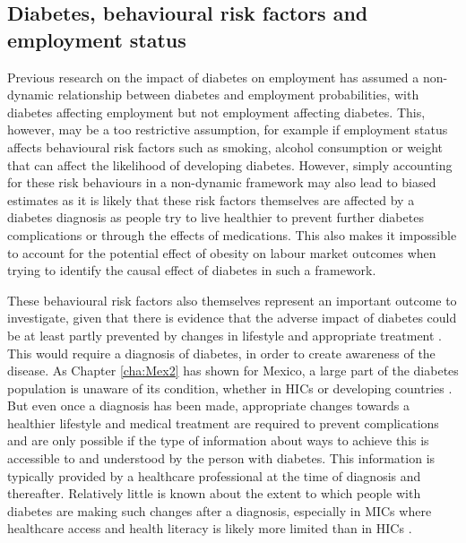 \subsection{Diabetes, behavioural risk factors and employment status}

Previous research on the impact of diabetes on employment has assumed a non-dynamic relationship between diabetes and employment probabilities, with diabetes affecting employment but not employment affecting diabetes. This, however, may be a too restrictive assumption, for example if employment status affects behavioural risk factors such as smoking, alcohol consumption or weight that can affect the likelihood of developing diabetes. However, simply accounting for these risk behaviours in a non-dynamic framework may also lead to biased estimates as it is likely that these risk factors themselves are affected by a diabetes diagnosis as people try to live healthier to prevent further diabetes complications or through the effects of medications. This also makes it impossible to account for the potential effect of obesity on labour market outcomes when trying to identify the causal effect of diabetes in such a framework.

These behavioural risk factors also themselves represent an important outcome to investigate, given that there is evidence that the adverse impact of diabetes could be at least partly prevented by changes in lifestyle and appropriate treatment \parencite{Wareham2016}. This would require a diagnosis of diabetes, in order to create awareness of the disease. As Chapter \ref{cha:Mex2} has shown for Mexico, a large part of the diabetes population is unaware of its condition, whether in \acp{HIC} or developing countries \parencite{Beagley2014}. But even once a diagnosis has been made, appropriate changes towards a healthier lifestyle and medical treatment are required to prevent complications and are only possible if the type of information about ways to achieve this is accessible to and understood by the person with diabetes. This information is typically provided by a healthcare professional at the time of diagnosis and thereafter. Relatively little is known about the extent to which people with diabetes are making such changes after a diagnosis, especially in \acp{MIC} where healthcare access and health literacy is likely more limited than in \acp{HIC} \parencite{Mills2014}.

